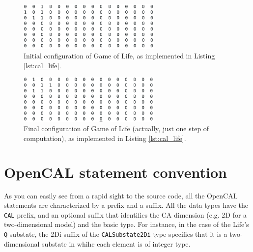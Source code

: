 \begin{figure}
  \begin{center}
    \includegraphics[width=7cm]{./images/OpenCAL/life_0000}
    \caption{Initial configuration of Game of Life, as implemented in Listing \ref{lst:cal_life}.}
    \label{fig:life_0000}
  \end{center}
\end{figure}

\begin{figure}
  \begin{center}
    \includegraphics[width=7cm]{./images/OpenCAL/life_LAST}
    \caption{Final configuration of Game of Life (actually, just one step of computation), as implemented in Listing \ref{lst:cal_life}.}
    \label{fig:life_LAST}
  \end{center}
\end{figure}

\section{OpenCAL statement convention}
As you can easily see from a rapid sight to the source code, all the
OpenCAL statements are characterized by a prefix and a suffix. All the
data types have the \verb'CAL' prefix, and an optional suffix that
identifies the CA dimension (e.g. 2D for a two-dimensional model) and
the basic type. For instance, in the case of the Life's \verb'Q'
substate, the 2Di suffix of the \verb'CALSubstate2Di' type specifies
that it is a two-dimensional substate in whihc each element is of
integer type.

